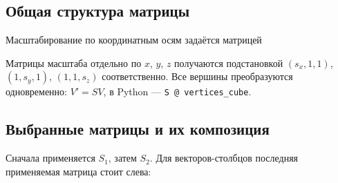 \documentclass[a4paper,14pt]{extarticle}
\begin{document}
\subsection*{Общая структура матрицы}

Масштабирование по координатным осям задаётся матрицей

\begin{center}\end{center}

Матрицы масштаба отдельно по $x$, $y$, $z$ получаются подстановкой
$(s_x,1,1)$, $(1,s_y,1)$, $(1,1,s_z)$ соответственно.
Все вершины преобразуются одновременно: $V'=SV$, в Python — \texttt{S @ vertices\_cube}.

\subsection*{Выбранные матрицы и их композиция}

\begin{center}\end{center}

Сначала применяется $S_1$, затем $S_2$. Для векторов-столбцов последняя
применяемая матрица стоит слева:
\end{document}
